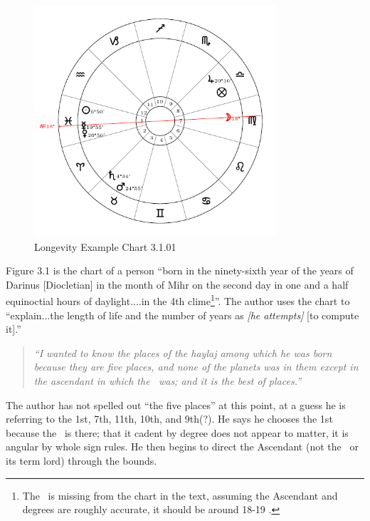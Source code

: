 \vspace{-1em}
\begin{figure}[H]
\centering
\includegraphics[width=0.8\textwidth]{charts/3_1_01}
\vspace{-1em}
\caption{Longevity Example Chart 3.1.01}
\end{figure}

Figure 3.1 is the chart of a person ``born in the ninety-sixth year of the years of Darinus [Diocletian] in the month of Mihr on the second day in one and a half equinoctial hours of daylight....in the 4th clime\footnote{The \Moon\, is missing from the chart in the text, assuming the Ascendant and \Sun\, degrees are roughly accurate, it should be around 18-19 \Virgo.}''. The author uses the chart to ``explain...the length of life and the number of years as \textsl{[he attempts]} [to compute it].''

\begin{quote}
\textsl{``I  wanted to know the places of the haylaj among which he was born because they are five places, and none of the planets was in them except in the ascendant in which the \Sun\, was; and it is the best of places.''}
\end{quote}

The author has not spelled out ``the five places'' at this point, at a guess he is referring to the 1st, 7th, 11th, 10th, and 9th(?).  He says he chooses the 1st because the \Sun\, is there; that it cadent by degree does not appear to matter, it is angular by whole sign rules. He then begins to direct the Ascendant (not the \Sun\, or its term lord) through the bounds.

